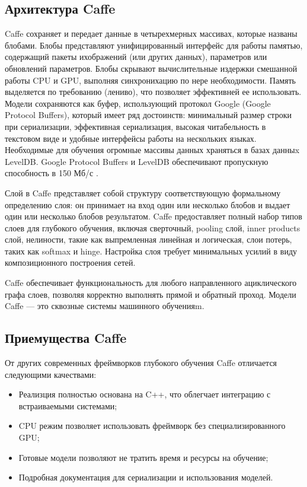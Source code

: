 \documentclass[a4paper,english,russian]{G2-105}
\begin{document}
\subsection{Архитектура Caffe}
\par Caffe сохраняет и передает данные в четырехмерных массивах, которые названы блобами. Блобы представляют унифицированный интерфейс для работы  памятью, содержащий пакеты ихображений (или других данных), параметров или обновлений параметров. Блобы скрывают вычислительные издержки смешанной работы CPU и GPU, выполняя синхронихацию по нере необходимости. Память выделяется по требованию (лениво), что позволяет эффективней ее использовать. Модели сохраняются как буфер, использующий протокол Google (Google Protocol Buffers), который имеет ряд достоинств: минимальный размер строки при сериализации, эффективная сериализация, высокая читабельность в текстовом виде и удобные интерфейсы работы на нескольких языках. Необходимые для обучения огромные массивы данных храняться в базах данныx LevelDB. Google Protocol Buffers и LevelDB обеспечивают пропускную способность в 150 Мб/с \cite{4}. 
\par Слой в Caffe представляет собой структуру соответствующую формальному определению слоя: он принимает на вход один или несколько блобов и выдает один или несколько блобов результатом. Caffe предоставляет полный набор типов слоев для глубокого обучения, включая сверточный, pooling слой, inner products слой, нелиности, такие как выпремленная линейная и логическая, слои потерь, таких как softmax и hinge. Настройка слоя требует минимальных усилий в виду композиционного построения сетей.
\par Caffe обеспечивает функциональность для любого направленного ациклического графа слоев, позволяя корректно выполнять прямой и обратный проход. Модели Caffe --- это сквозные системы машинного обученияm.
\ttl
\subsection{Приемущества Caffe}
\par От других современных фреймворков глубокого обучения Caffe отличается следующими качествами:
\begin{itemize}
	\item Реализция полностью основана на C++, что облегчает интеграцию с встраиваемыми системами;
	\item CPU режим позволяет использовать фреймворк без специализированного GPU;
	\item Готовые модели позволяют не тратить время и ресурсы на обучение;
	\item Подробная документация для сериализации и использования моделей.
\end{itemize}
\ttl
\end{document}
